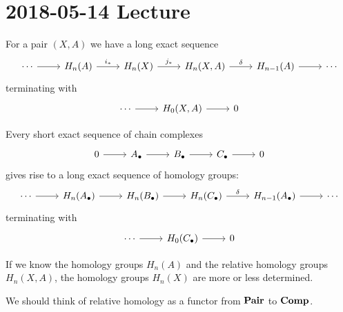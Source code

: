 \section{2018-05-14 Lecture}

\begin{thm}
  For a pair $(X,A)$ we have a long exact sequence
  \begin{equation*}
    \begin{tikzcd}
      \cdots \ar[r] & H_n(A) \ar[r, "i_*"] & H_n(X) \ar[r, "j_*"] & H_n(X,A) \ar[r, "\delta"] & H_{n-1}(A) \ar[r] & \cdots
    \end{tikzcd}
  \end{equation*}
  terminating with
  \begin{equation*}
    \begin{tikzcd}
      \cdots \ar[r] & H_0(X,A) \ar[r] & 0
    \end{tikzcd}
  \end{equation*}
\end{thm}

\begin{rmk}
  Every short exact sequence of chain complexes
  \begin{equation*}
    \begin{tikzcd}
      0 \ar[r] & A_\bullet \ar[r] & B_\bullet \ar[r] & C_\bullet \ar[r] & 0
    \end{tikzcd}
  \end{equation*}
  gives rise to a long exact sequence of homology groups:
  \begin{equation*}
    \begin{tikzcd}
      \cdots \ar[r] & H_n(A_\bullet) \ar[r] & H_n(B_\bullet) \ar[r] & H_n(C_\bullet) \ar[r, "\delta"] & H_{n-1}(A_\bullet) \ar[r] & \cdots
    \end{tikzcd}
  \end{equation*}
  terminating with
  \begin{equation*}
    \begin{tikzcd}
      \cdots \ar[r] & H_0(C_\bullet) \ar[r] & 0
    \end{tikzcd}
  \end{equation*}
\end{rmk}

If we know the homology groups $H_n(A)$ and the relative homology groups $H_n(X,A)$, the homology groups $H_n(X)$ are more or less determined.

We should think of relative homology as a functor from $\mathbf{Pair}$ to $\mathbf{Comp}$.

